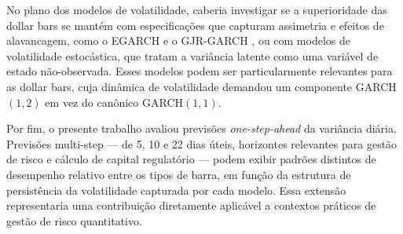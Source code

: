 No plano dos modelos de volatilidade, caberia investigar se a superioridade das dollar bars
se mantém com especificações que capturam assimetria e efeitos de alavancagem, como o
EGARCH \citep{Nelson1991} e o GJR-GARCH \citep{GlostenJagannathanRunkle1993}, ou com
modelos de volatilidade estocástica, que tratam a variância latente como uma variável
de estado não-observada. Esses modelos podem ser particularmente relevantes para as
dollar bars, cuja dinâmica de volatilidade demandou um componente GARCH$(1,2)$ em vez
do canônico GARCH$(1,1)$.

Por fim, o presente trabalho avaliou previsões \textit{one-step-ahead} da variância
diária. Previsões multi-step — de 5, 10 e 22 dias úteis, horizontes relevantes para
gestão de risco e cálculo de capital regulatório — podem exibir padrões distintos de
desempenho relativo entre os tipos de barra, em função da estrutura de persistência da
volatilidade capturada por cada modelo. Essa extensão representaria uma contribuição
diretamente aplicável a contextos práticos de gestão de risco quantitativo.

